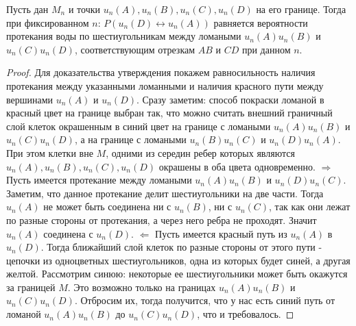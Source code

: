

\begin{suggestion}\label{2.14}
Пусть дан $M_n$ и точки $u_n(A), u_n(B), u_n(C), u_n(D)$ на его границе. Тогда при фиксированном $n$: $P(u_n(D)\leftrightarrow{}u_n(A))$ равняется вероятности протекания воды по шестиугольникам между ломаными $u_n(A)u_n(B)$ и $u_n(C)u_n(D)$, соответствующим отрезкам $AB$ и $CD$ при данном $n$.
\end{suggestion}

\begin{proof}
Для доказательства утверждения покажем равносильность наличия протекания между указанными ломанными и наличия красного пути между вершинами $u_n(A)$ и $u_n(D)$. Сразу заметим: способ покраски ломаной в красный цвет на границе выбран так, что можно считать внешний граничный слой клеток окрашенным в синий цвет на границе с ломаными $u_n(A)u_n(B)$ и $u_n(C)u_n(D)$, а на границе с ломаными $u_n(B)u_n(C)$ и $u_n(D)u_n(A)$. При этом клетки вне $M$, одними из середин ребер которых являются $u_n(A), u_n(B), u_n(C), u_n(D)$ окрашены в оба цвета одновременно.
\newline
$\Rightarrow{}$ Пусть имеется протекание между ломаными $u_n(A)u_n(B)$ и $u_n(D)u_n(C)$. Заметим, что данное протекание делит шестиугольники на две части. Тогда $u_n(A)$ не может быть соединена ни с $u_n(B)$, ни с $u_n(C)$, так как они лежат по разные стороны от протекания, а через него ребра не проходят. Значит $u_n(A)$ соединена с $u_n(D)$.
\newline
$\Leftarrow{}$ Пусть имеется красный путь из $u_n(A)$ в $u_n(D)$. Тогда ближайший слой клеток по разные стороны от этого пути - цепочки из одноцветных шестиугольников, одна из которых будет синей, а другая желтой. Рассмотрим синюю: некоторые ее шестиугольники может быть окажутся за границей $M$. Это возможно только на границах $u_n(A)u_n(B)$ и $u_n(C)u_n(D)$. Отбросим их, тогда получится, что у нас есть синий путь от ломаной $u_n(A)u_n(B)$ до $u_n(C)u_n(D)$, что и требовалось.

\end{proof}